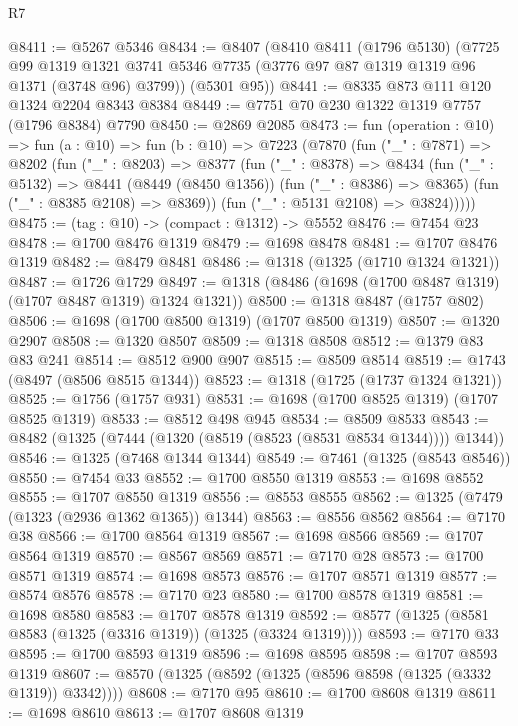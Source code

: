 \begin{lexlean}{R7}
\begin{coremodule}
@8411 := @5267 @5346
@8434 := @8407
    (@8410
      @8411
      (@1796 @5130)
      (@7725
        @99
        @1319
        @1321
        @3741
        @5346
        @7735
        (@3776 @97 @87 @1319 @1319 @96 @1371 (@3748 @96) @3799))
      (@5301 @95))
@8441 := @8335 @873 @111 @120 @1324 @2204 @8343 @8384
@8449 := @7751 @70 @230 @1322 @1319 @7757 (@1796 @8384) @7790
@8450 := @2869 @2085
@8473 := fun (operation : @10) =>
  fun (a : @10) =>
  fun (b : @10) =>
  @7223
    (@7870
      (fun ("_" : @7871) =>
      @8202
        (fun ("_" : @8203) =>
        @8377
          (fun ("_" : @8378) =>
          @8434
            (fun ("_" : @5132) =>
            @8441
              (@8449 (@8450 @1356))
              (fun ("_" : @8386) => @8365)
              (fun ("_" : @8385 @2108) => @8369))
            (fun ("_" : @5131 @2108) => @3824)))))
@8475 := (tag : @10) -> (compact : @1312) -> @5552
@8476 := @7454 @23
@8478 := @1700 @8476 @1319
@8479 := @1698 @8478
@8481 := @1707 @8476 @1319
@8482 := @8479 @8481
@8486 := @1318 (@1325 (@1710 @1324 @1321))
@8487 := @1726 @1729
@8497 := @1318 (@8486 (@1698 (@1700 @8487 @1319) (@1707 @8487 @1319) @1324 @1321))
@8500 := @1318 @8487 (@1757 @802)
@8506 := @1698 (@1700 @8500 @1319) (@1707 @8500 @1319)
@8507 := @1320 @2907
@8508 := @1320 @8507
@8509 := @1318 @8508
@8512 := @1379 @83 @83 @241
@8514 := @8512 @900 @907
@8515 := @8509 @8514
@8519 := @1743 (@8497 (@8506 @8515 @1344))
@8523 := @1318 (@1725 (@1737 @1324 @1321))
@8525 := @1756 (@1757 @931)
@8531 := @1698 (@1700 @8525 @1319) (@1707 @8525 @1319)
@8533 := @8512 @498 @945
@8534 := @8509 @8533
@8543 := @8482 (@1325 (@7444 (@1320 (@8519 (@8523 (@8531 @8534 @1344)))) @1344))
@8546 := @1325 (@7468 @1344 @1344)
@8549 := @7461 (@1325 (@8543 @8546))
@8550 := @7454 @33
@8552 := @1700 @8550 @1319
@8553 := @1698 @8552
@8555 := @1707 @8550 @1319
@8556 := @8553 @8555
@8562 := @1325 (@7479 (@1323 (@2936 @1362 @1365)) @1344)
@8563 := @8556 @8562
@8564 := @7170 @38
@8566 := @1700 @8564 @1319
@8567 := @1698 @8566
@8569 := @1707 @8564 @1319
@8570 := @8567 @8569
@8571 := @7170 @28
@8573 := @1700 @8571 @1319
@8574 := @1698 @8573
@8576 := @1707 @8571 @1319
@8577 := @8574 @8576
@8578 := @7170 @23
@8580 := @1700 @8578 @1319
@8581 := @1698 @8580
@8583 := @1707 @8578 @1319
@8592 := @8577 (@1325 (@8581 @8583 (@1325 (@3316 @1319)) (@1325 (@3324 @1319))))
@8593 := @7170 @33
@8595 := @1700 @8593 @1319
@8596 := @1698 @8595
@8598 := @1707 @8593 @1319
@8607 := @8570 (@1325 (@8592 (@1325 (@8596 @8598 (@1325 (@3332 @1319)) @3342))))
@8608 := @7170 @95
@8610 := @1700 @8608 @1319
@8611 := @1698 @8610
@8613 := @1707 @8608 @1319

\end{coremodule}
\end{lexlean}
